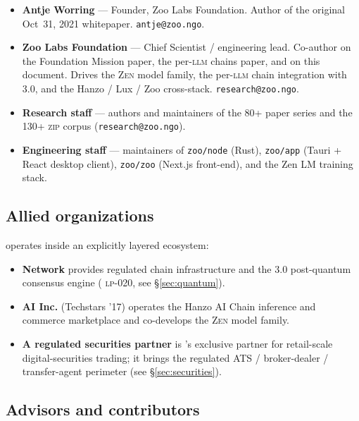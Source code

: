 \begin{itemize}[nosep,leftmargin=1.2em]
\item \textbf{Antje Worring} --- Founder, Zoo Labs Foundation.
   Author of the original Oct~31, 2021 whitepaper.
   \texttt{antje@zoo.ngo}.
\item \textbf{Zoo Labs Foundation} --- Chief Scientist / engineering lead.
   Co-author on the Foundation Mission paper, the per-\textsc{llm}
   chains paper, and on this document. Drives the \textsc{Zen} model
   family, the per-\textsc{llm} chain integration with \Lux{} \Quasar{}
   3.0, and the Hanzo / Lux / Zoo cross-stack. \texttt{research@zoo.ngo}.
\item \textbf{Research staff} --- authors and maintainers of the
   80+ paper series and the 130+ \textsc{zip} corpus
   (\texttt{research@zoo.ngo}).
\item \textbf{Engineering staff} --- maintainers of \texttt{zoo/node}
   (Rust), \texttt{zoo/app} (Tauri + React desktop client),
   \texttt{zoo/zoo} (Next.js front-end), and the Zen LM training stack.
\end{itemize}

\subsection{Allied organizations}

\Zoo{} operates inside an explicitly layered ecosystem:

\begin{itemize}[nosep,leftmargin=1.2em]
\item \textbf{\Lux{} Network} provides regulated chain infrastructure
   and the \Quasar{} 3.0 post-quantum consensus engine
   (\Lux{} \textsc{lp-020}, see \S\ref{sec:quantum}).
\item \textbf{\Hanzo{} AI Inc.} (Techstars '17) operates the Hanzo AI
   Chain inference and commerce marketplace and co-develops the
   \textsc{Zen} model family.
\item \textbf{A regulated securities partner} is \Zoo{}'s exclusive
   partner for retail-scale digital-securities trading; it brings the regulated
   ATS / broker-dealer / transfer-agent perimeter
   (see \S\ref{sec:securities}).
\end{itemize}

\subsection{Advisors and contributors}

